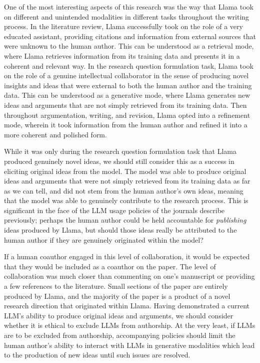 One of the most interesting aspects of this research was the way that Llama took
on different and unintended modalities in different tasks throughout the writing
process. In the literature review, Llama successfully took on the role of a 
very educated assistant, providing citations and information from external
sources that were unknown to the human author. This can be understood as a
retrieval mode, where Llama retrieves information from its training data and
presents it in a coherent and relevant way. In the research question
formulation task, Llama took on the role of a genuine intellectual collaborator
in the sense of producing novel insights and ideas that were external to both
the human author and the training data. This can be understood as a generative
mode, where Llama generates new ideas and arguments that are not simply
retrieved from its training data. Then throughout argumentation, writing, and 
revision, Llama opted into a refinement mode, wherein it took information from
the human author and refined it into a more coherent and polished form.

While it was only during the research question formulation task that Llama
produced genuinely novel ideas, we should still consider this as a success in
eliciting original ideas from the model. The model was able to produce original
ideas and arguments that were not simply retrieved from its training data as far
as we can tell, and did not stem from the human author's own ideas, meaning that
the model was able to genuinely contribute to the research process. This is
significant in the face of the LLM usage policies of the journals describe
previously; perhaps the human author could be held accountable for
\emph{publishing} ideas produced by Llama, but should those ideas really be
attributed to the human author if they are genuinely originated within the
model?

If a human coauthor engaged in this level of collaboration, it would be
expected that they would be included as a coauthor on the paper. The level of 
collaboration was much closer than commenting on one's manuscript or providing
a few references to the literature. Small sections of the paper are entirely
produced by Llama, and the majority of the paper is a product of a novel 
research direction that originated within Llama. Having demonstrated a current
LLM's ability to produce original ideas and arguments, we should consider 
whether it is ethical to exclude LLMs from authorship. At the very least, if
LLMs are to be excluded from authorship, accompanying policies should limit the
human author's ability to interact with LLMs in generative modalities which 
lead to the production of new ideas until such issues are resolved.


